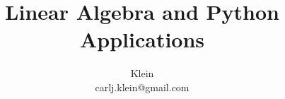 \documentclass{article}
\begin{document}
	\title{Linear Algebra and Python Applications}
	\author{Klein \\ carlj.klein@gmail.com}
	\date{}
	\maketitle
\end{document}
